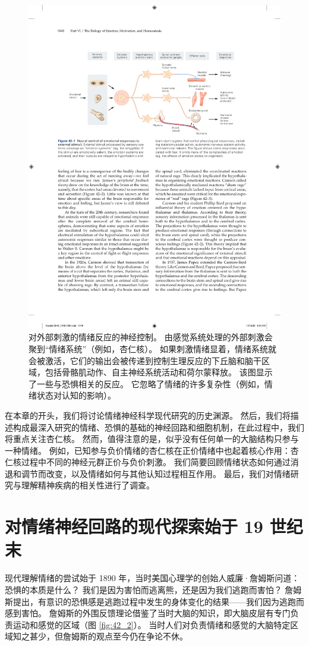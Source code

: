 \begin{figure}[htbp]
	\centering
	\includegraphics[width=0.8\linewidth]{chap42/fig_42_1}
	\caption{对外部刺激的情绪反应的神经控制。 由感觉系统处理的外部刺激会聚到“情绪系统”（例如，杏仁核）。 如果刺激情绪显着，情绪系统就会被激活，它们的输出会被传递到控制生理反应的下丘脑和脑干区域，包括骨骼肌动作、自主神经系统活动和荷尔蒙释放。 该图显示了一些与恐惧相关的反应。 它忽略了情绪的许多复杂性（例如，情绪状态对认知的影响）。}
	\label{fig:42_1}
\end{figure}

在本章的开头，我们将讨论情绪神经科学现代研究的历史渊源。 然后，我们将描述构成最深入研究的情绪、恐惧的基础的神经回路和细胞机制，在此过程中，我们将重点关注杏仁核。 然而，值得注意的是，似乎没有任何单一的大脑结构只参与一种情绪。 例如，已知参与负价情绪的杏仁核在正价情绪中也起着核心作用：杏仁核过程中不同的神经元群正价与负价刺激。 我们简要回顾情绪状态如何通过消退和调节而改变，以及情绪如何与其他认知过程相互作用。 最后，我们对情绪研究与理解精神疾病的相关性进行了调查。


\section{对情绪神经回路的现代探索始于 19 世纪末}
现代理解情绪的尝试始于 1890 年，当时美国心理学的创始人威廉·詹姆斯问道：恐惧的本质是什么？ 我们是因为害怕而逃离熊，还是因为我们逃跑而害怕？ 詹姆斯提出，有意识的恐惧感是逃跑过程中发生的身体变化的结果——我们因为逃跑而感到害怕。 
詹姆斯的外围反馈理论借鉴了当时大脑的知识，即大脑皮层有专门负责运动和感觉的区域（图 \ref{fig:42_2}）。 
当时人们对负责情绪和感觉的大脑特定区域知之甚少，但詹姆斯的观点至今仍在争论不休。

